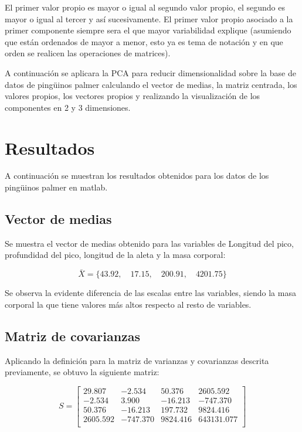 \documentclass[11pt, letterpaper]{article}
\begin{document}
El primer valor propio es mayor o igual al segundo valor propio, el segundo es mayor o igual al tercer y así sucesivamente. El primer valor propio asociado a la primer componente siempre sera el que mayor variabilidad explique (asumiendo que están ordenados de mayor a menor, esto ya es tema de notación y en que orden se realicen las operaciones de matrices).

A continuación se aplicara la PCA para reducir dimensionalidad sobre la base de datos de pingüinos palmer calculando el vector de medias, la matriz centrada, los valores propios, los vectores propios y realizando la visualización de los componentes en 2 y 3 dimensiones.
	
\newpage
	
\section{Resultados}

A continuación se muestran los resultados obtenidos para los datos de los pingüinos palmer en matlab.

\subsection{Vector de medias}

Se muestra el vector de medias obtenido para las variables de Longitud del pico, profundidad del pico, longitud de la aleta y la masa corporal:

$$\bar{X} = \{43.92,\quad 17.15,\quad  200.91,\quad 4201.75\}$$

Se observa la evidente diferencia de las escalas entre las variables, siendo la masa corporal la que tiene valores más altos respecto al resto de variables.

\subsection{Matriz de covarianzas}

Aplicando la definición para la matriz de varianzas y covarianzas descrita previamente, se obtuvo la siguiente matriz:

$$
S = 
\begin{bmatrix}
	29.807 & -2.534 & 50.376 & 2605.592 \\
	-2.534 & 3.900 & -16.213 & -747.370 \\
	50.376 & -16.213 & 197.732 & 9824.416 \\
	2605.592 & -747.370 & 9824.416 & 643131.077 \\
\end{bmatrix}
$$
\end{document}
